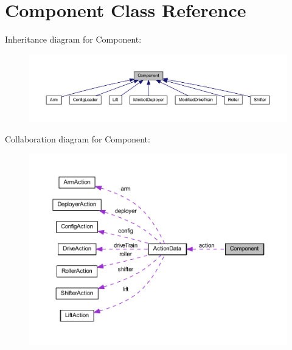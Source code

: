 \hypertarget{class_component}{
\section{\-Component \-Class \-Reference}
\label{class_component}
}


\-Inheritance diagram for \-Component\-:
\nopagebreak
\begin{figure}[H]
\begin{center}
\leavevmode
\includegraphics[width=350pt]{class_component__inherit__graph}
\end{center}
\end{figure}


\-Collaboration diagram for \-Component\-:\nopagebreak
\begin{figure}[H]
\begin{center}
\leavevmode
\includegraphics[width=350pt]{class_component__coll__graph}
\end{center}
\end{figure}
